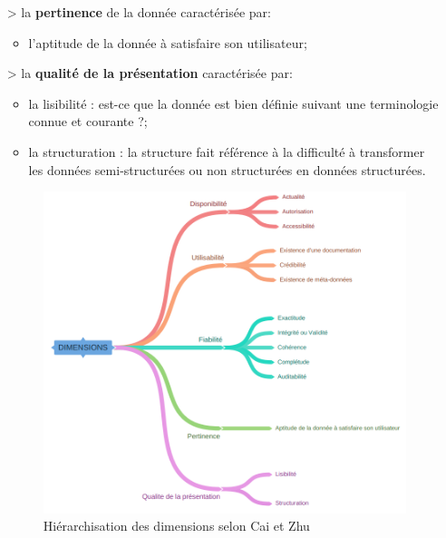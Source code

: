 \begin{itemize}
\item[>] la \textbf{pertinence} de la donn\'ee caract\'eris\'ee par:
\begin{itemize}
\item l'aptitude de la donn\'ee \`a satisfaire son utilisateur;
\end{itemize}

\item[>] la \textbf{qualit\'e de la pr\'esentation} caract\'eris\'ee par:
\begin{itemize}[parsep=0cm,itemsep=0cm]
\item la lisibilit\'e : est-ce que la donn\'ee est bien d\'efinie suivant une terminologie connue et courante ?;
\item la structuration : la structure fait référence \`a la difficulté à transformer les données semi-structurées ou non structurées en données structurées.
\end{itemize}
\newpage
\begin{figure}[!h]
  \caption{Hiérarchisation des dimensions selon Cai et Zhu}  \label{fig:cai_shu}
  \begin{center}
    \includegraphics[scale=0.6]{Main/Static/Dimensions_Screen.png} 
  \end{center}
\end{figure}

\end{itemize}  

